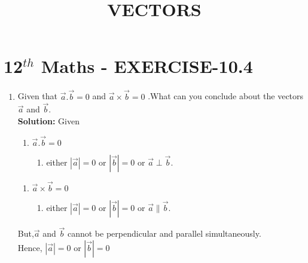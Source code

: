 \documentclass[10pt]{article}
\newcommand{\solution}{\noindent \textbf{Solution: }}
\providecommand{\abs}[1]{\left\vert#1\right\vert}
\begin{document}
\begin{center}
\title{\textbf{VECTORS}}
\date{\vspace{-5ex}} %
\maketitle
\end{center}

\section{12$^{th}$ Maths - EXERCISE-10.4}

\begin{enumerate}
\item Given that $\overrightarrow{a}.\overrightarrow{b}=0$ and $\overrightarrow{a}\times\overrightarrow{b}=0$ .What can you conclude about the vectors $\overrightarrow{a}$ and $\overrightarrow{b}$.\\  

\solution
Given  

\begin{enumerate}
\item $\overrightarrow{a}.\overrightarrow{b}=0$
\begin{enumerate}
\item either $\abs{\overrightarrow{a}}=0$ or $\abs{\overrightarrow{b}}=0$ or $\overrightarrow{a}\perp\overrightarrow{b}$.
\end{enumerate}
\end{enumerate}
\begin{enumerate}
\item $\overrightarrow{a}\times\overrightarrow{b}=0$
\begin{enumerate}
\item either $\abs{\overrightarrow{a}}=0$ or $\abs{\overrightarrow{b}}=0$ or  $\overrightarrow{a}\parallel\overrightarrow{b}$.
\end{enumerate}
\end{enumerate}
But,$\overrightarrow{a}$ and $\overrightarrow{b}$ cannot be perpendicular and parallel simultaneously.\\
Hence, $\abs{\overrightarrow{a}}=0$ or $\abs{\overrightarrow{b}}=0$

\end{enumerate}
\end{document}
